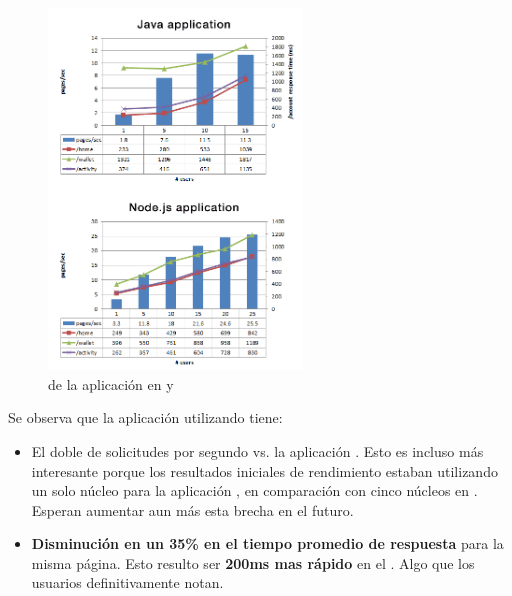 \begin{figure}[h!]
	\centering
	\includegraphics[width=0.6\textwidth]{figuras/cap2/java_nodejs_benchmark_paypal.png}
	\caption{\performanceQA de la aplicación en \javaNAME y \nodejsNAME}
	\label{figure:java_benchmark_paypal}
\end{figure}

Se observa que la aplicación utilizando \nodejsNAME tiene:

\begin{itemize}
\item El doble de solicitudes por segundo vs. la aplicación \javaNAME. Esto es incluso más interesante porque los resultados iniciales de rendimiento estaban utilizando un solo núcleo para la aplicación \nodejsNAME, en comparación con cinco núcleos en \javaNAME. Esperan aumentar aun más esta brecha en el futuro.
\item \textbf{Disminución en un 35\% en el tiempo promedio de respuesta} para la misma página. Esto resulto ser \textbf{200ms mas rápido} en el \serverAS. Algo que los usuarios definitivamente notan.
\end{itemize}

